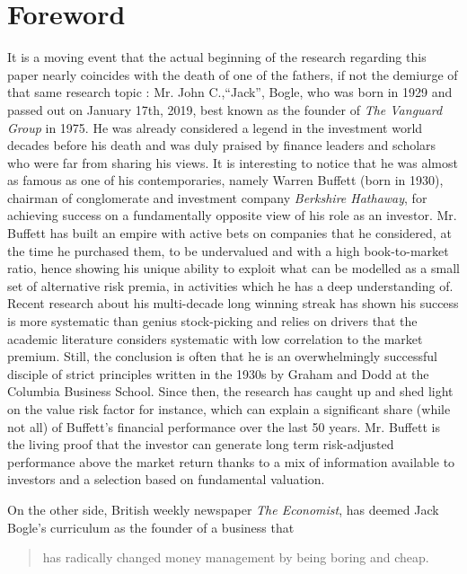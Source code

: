 \section{Foreword}
\label{Foreword}
It is a moving event that the actual beginning of the research regarding this paper nearly coincides with the death of one of the fathers, if not the demiurge of that same research topic : Mr. John C.,``Jack'', Bogle, who was born in 1929 and passed out on January 17th, 2019, best known as the founder of \textit{The Vanguard Group} in 1975. He was already considered a legend in the investment world decades before his death and was duly praised by finance leaders and scholars who were far from sharing his views. It is interesting to notice that he was almost as famous as one of his contemporaries, namely Warren Buffett (born in 1930), chairman of conglomerate and investment company \textit{Berkshire Hathaway}, for achieving success on a fundamentally opposite view of his role as an investor. Mr. Buffett has built an empire with active bets on companies that he considered, at the time he purchased them, to be undervalued and with a high book-to-market ratio, hence showing his unique ability to exploit what can be modelled as a small set of alternative risk premia, in activities which he has a deep understanding of. Recent research about his multi-decade long winning streak has shown his success is more systematic than genius stock-picking and relies on drivers that the academic literature considers systematic with low correlation to the market premium. Still, the conclusion is often that he is an overwhelmingly successful disciple of strict principles written in the 1930s by Graham and Dodd at the Columbia Business School. Since then, the research has caught up and shed light on the value risk factor for instance, which can explain a significant share (while not all) of Buffett's financial performance over the last 50 years. Mr. Buffett is the living proof that the investor can generate long term risk-adjusted performance above the market return thanks to a mix of information available to investors and a selection based on fundamental valuation. 

On the other side, British weekly newspaper \textit{The Economist}, has deemed Jack Bogle's curriculum as the founder of a business that
\begin{quotation}
has radically changed money management by being boring and cheap.
\end{quotation}

